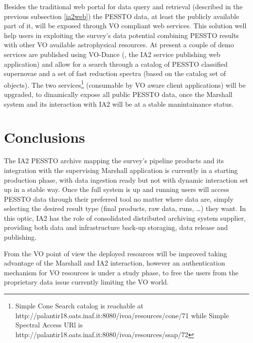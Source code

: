 \documentclass[11pt,twoside]{article}
\begin{document}
Besides the traditional web portal for data query and retrieval (described in the previous subsection \ref{ia2web}) the PESSTO data, at least the publicly available part of it, will be exposed through VO compliant web services. This solution well help users in exploiting the survey's data potential combining PESSTO results with other VO available astrophysical resources.
At present a couple of demo services are published using VO-Dance (\cite{molinaro_spie12}, the IA2 service publishing web application) and allow for a search through a catalog of PESSTO classified supernovae and a set of fast reduction spectra (based on the catalog set of objects). The two services\footnote{Simple Cone Search catalog is reachable at http://palantir18.oats.inaf.it:8080/ivoa/resources/cone/71 while Simple Spectral Access URl is http://palantir18.oats.inaf.it:8080/ivoa/resources/ssap/72} (consumable by VO aware client applications) will be upgraded, to dinamically expose all public PESSTO data, once the Marshall system and its interaction with IA2 will be at a stable manintainance status.

\section{Conclusions}

The IA2 PESSTO archive mapping the survey's pipeline products and its integration with the supervising Marshall application is currently in a starting production phase, with data ingestion ready but not with dynamic interaction set up in a stable way. Once the full system is up and running users will access PESSTO data through their preferred tool no matter where data are, simply selecting the desired result type (final products, raw data, runs, \dots) they want.
In this optic, IA2 has the role of consolidated distributed archiving system supplier, providing both data and infrastructure back-up storaging, data release and publishing.

From the VO point of view the deployed resources will be improved taking advantage of the Marshall and IA2 interaction, however an authentication mechanism for VO resources is under a study phase, to free the users from the proprietary data issue currently limiting the VO world.


\end{document}
